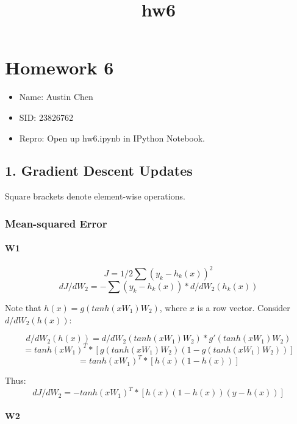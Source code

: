 \documentclass{article}
\title{hw6}
\begin{document}
    
    
    \maketitle
    
    

    
    \section{Homework 6}\label{homework-6}

\begin{itemize}
\itemsep1pt\parskip0pt
\item
  Name: Austin Chen
\item
  SID: 23826762
\item
  Repro: Open up hw6.ipynb in IPython Notebook.
\end{itemize}

    \subsection{1. Gradient Descent Updates}\label{gradient-descent-updates}

Square brackets denote element-wise operations.

\subsubsection{Mean-squared Error}\label{mean-squared-error}

\paragraph{W1}\label{w1}

\[J = 1/2 \sum (y_k - h_{k}(x))^2\]
\[dJ / dW_2 = - \sum (y_k - h_{k}(x)) * d/dW_2 (h_{k}(x))\]

Note that \(h(x) = g(tanh(xW_1)W_2)\), where \(x\) is a row vector.
Consider \(d/dW_2 (h(x))\):

\[d/dW_2 (h(x)) = d/dW_2 (tanh(xW_1)W_2) * g'(tanh(xW_1)W_2)\]
\[ = tanh(xW_1)^T * [g(tanh(xW_1)W_2) (1 - g(tanh(xW_1)W_2))]\]
\[ = tanh(xW_1)^T * [h(x) (1 - h(x))]\]

Thus: \[dJ / dW_2 = - tanh(xW_1)^T * [h(x) (1 - h(x))(y - h(x))] \]

\paragraph{W2}\label{w2}
\end{document}
